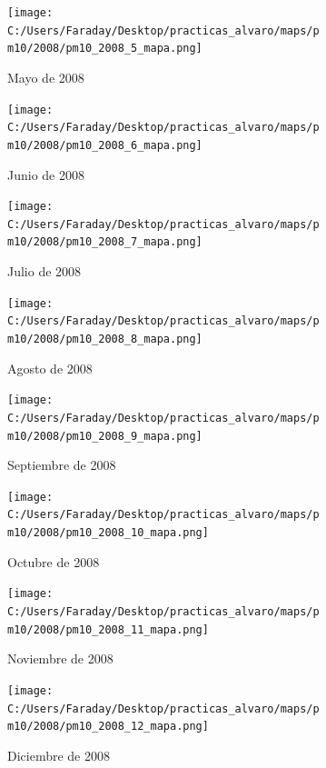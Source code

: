 \documentclass[12pt]{article}
\begin{document}
\begin{figure}[H]
\centering
\begin{subfigure}[h]{0.45\textwidth}
\texttt{[image: C:/Users/Faraday/Desktop/practicas\_alvaro/maps/pm10/2008/pm10\_2008\_5\_mapa.png]}
\caption{Mayo de 2008}
\label{fig:map-mon-3-5-2008}
\end{subfigure}
%
\begin{subfigure}[H]{0.45\textwidth}
\texttt{[image: C:/Users/Faraday/Desktop/practicas\_alvaro/maps/pm10/2008/pm10\_2008\_6\_mapa.png]}
\caption{Junio de 2008}
\label{fig:map-mon-3-6-2008}
\end{subfigure}
\caption{}
\end{figure}

\newpage

\begin{figure}[H]
\centering
\begin{subfigure}[h]{0.45\textwidth}
\texttt{[image: C:/Users/Faraday/Desktop/practicas\_alvaro/maps/pm10/2008/pm10\_2008\_7\_mapa.png]}
\caption{Julio de 2008}
\label{fig:map-mon-3-7-2008}
\end{subfigure}
%
\begin{subfigure}[H]{0.45\textwidth}
\texttt{[image: C:/Users/Faraday/Desktop/practicas\_alvaro/maps/pm10/2008/pm10\_2008\_8\_mapa.png]}
\caption{Agosto de 2008}
\label{fig:map-mon-3-8-2008}
\end{subfigure}
\caption{}
\end{figure}

\begin{figure}[H]
\centering
\begin{subfigure}[h]{0.45\textwidth}
\texttt{[image: C:/Users/Faraday/Desktop/practicas\_alvaro/maps/pm10/2008/pm10\_2008\_9\_mapa.png]}
\caption{Septiembre de 2008}
\label{fig:map-mon-3-9-2008}
\end{subfigure}
%
\begin{subfigure}[H]{0.45\textwidth}
\texttt{[image: C:/Users/Faraday/Desktop/practicas\_alvaro/maps/pm10/2008/pm10\_2008\_10\_mapa.png]}
\caption{Octubre de 2008}
\label{fig:map-mon-3-10-2008}
\end{subfigure}
\caption{}
\end{figure}

\begin{figure}[H]
\centering
\begin{subfigure}[h]{0.45\textwidth}
\texttt{[image: C:/Users/Faraday/Desktop/practicas\_alvaro/maps/pm10/2008/pm10\_2008\_11\_mapa.png]}
\caption{Noviembre de 2008}
\label{fig:map-mon-3-11-2008}
\end{subfigure}
%
\begin{subfigure}[H]{0.45\textwidth}
\texttt{[image: C:/Users/Faraday/Desktop/practicas\_alvaro/maps/pm10/2008/pm10\_2008\_12\_mapa.png]}
\caption{Diciembre de 2008}
\label{fig:map-mon-3-12-2008}
\end{subfigure}
\caption{}
\end{figure}
\end{document}
